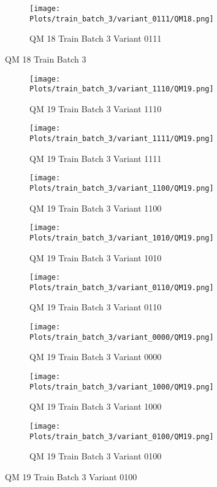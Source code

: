 \documentclass{DissertateFigs}
\begin{document}
\begin{figure}[t!]
\medskip

    \begin{subfigure}{0.47\textwidth}
    \texttt{[image: Plots/train\_batch\_3/variant\_0111/QM18.png]}
    \caption{QM 18 Train Batch 3 Variant 0111}
    \end{subfigure}
\caption{QM 18 Train Batch 3}
    \end{figure}
\clearpage
\begin{figure}[t!]
    \begin{subfigure}{0.47\textwidth}
    \texttt{[image: Plots/train\_batch\_3/variant\_1110/QM19.png]}
    \caption{QM 19 Train Batch 3 Variant 1110}
    \end{subfigure}
    \begin{subfigure}{0.47\textwidth}
    \texttt{[image: Plots/train\_batch\_3/variant\_1111/QM19.png]}
    \caption{QM 19 Train Batch 3 Variant 1111}
    \end{subfigure}

\medskip

    \begin{subfigure}{0.47\textwidth}
    \texttt{[image: Plots/train\_batch\_3/variant\_1100/QM19.png]}
    \caption{QM 19 Train Batch 3 Variant 1100}
    \end{subfigure}
    \begin{subfigure}{0.47\textwidth}
    \texttt{[image: Plots/train\_batch\_3/variant\_1010/QM19.png]}
    \caption{QM 19 Train Batch 3 Variant 1010}
    \end{subfigure}

\medskip

    \begin{subfigure}{0.47\textwidth}
    \texttt{[image: Plots/train\_batch\_3/variant\_0110/QM19.png]}
    \caption{QM 19 Train Batch 3 Variant 0110}
    \end{subfigure}
    \begin{subfigure}{0.47\textwidth}
    \texttt{[image: Plots/train\_batch\_3/variant\_0000/QM19.png]}
    \caption{QM 19 Train Batch 3 Variant 0000}
    \end{subfigure}

\medskip

    \begin{subfigure}{0.47\textwidth}
    \texttt{[image: Plots/train\_batch\_3/variant\_1000/QM19.png]}
    \caption{QM 19 Train Batch 3 Variant 1000}
    \end{subfigure}
    \begin{subfigure}{0.47\textwidth}
    \texttt{[image: Plots/train\_batch\_3/variant\_0100/QM19.png]}
    \caption{QM 19 Train Batch 3 Variant 0100}
    \end{subfigure}


\end{figure}
\end{document}
